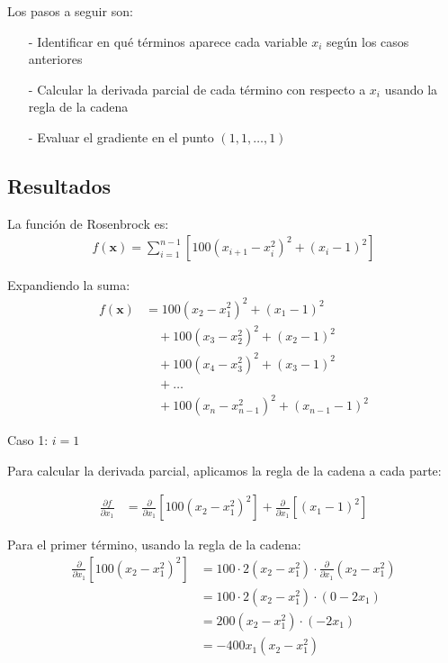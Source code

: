 \documentclass{article}
\begin{document}
Los pasos a seguir son:
\begin{enumerate}
    \item[-] Identificar en qué términos aparece cada variable $x_i$ según los casos anteriores
    \item[-] Calcular la derivada parcial de cada término con respecto a $x_i$ usando la regla de la cadena
    \item[-] Evaluar el gradiente en el punto $(1, 1, \ldots, 1)$
\end{enumerate}

\subsection{Resultados}
\setcounter{equation}{0}

La función de Rosenbrock es:
\begin{align}
f(\mathbf{x}) = \sum_{i=1}^{n-1} \left[100(x_{i+1} - x_i^2)^2 + (x_i - 1)^2\right]
\end{align}

Expandiendo la suma:
\begin{align}
f(\mathbf{x}) &= 100(x_2 - x_1^2)^2 + (x_1 - 1)^2 \\
&\quad + 100(x_3 - x_2^2)^2 + (x_2 - 1)^2 \\
&\quad + 100(x_4 - x_3^2)^2 + (x_3 - 1)^2 \\
&\quad + \ldots \\
&\quad + 100(x_n - x_{n-1}^2)^2 + (x_{n-1} - 1)^2
\end{align}

Caso 1: $i = 1$

Para calcular la derivada parcial, aplicamos la regla de la cadena a cada parte:

\begin{align}
\frac{\partial f}{\partial x_1} &= \frac{\partial}{\partial x_1}\left[100(x_2 - x_1^2)^2\right] + \frac{\partial}{\partial x_1}\left[(x_1 - 1)^2\right]
\end{align}

Para el primer término, usando la regla de la cadena:
\begin{align}
\frac{\partial}{\partial x_1}\left[100(x_2 - x_1^2)^2\right] &= 100 \cdot 2(x_2 - x_1^2) \cdot \frac{\partial}{\partial x_1}(x_2 - x_1^2) \\
&= 100 \cdot 2(x_2 - x_1^2) \cdot (0 - 2x_1) \\
&= 200(x_2 - x_1^2) \cdot (-2x_1) \\
&= -400x_1(x_2 - x_1^2)
\end{align}
\end{document}
